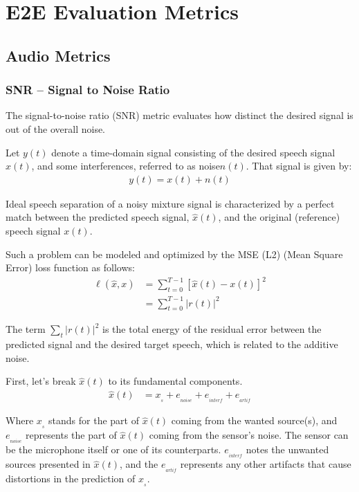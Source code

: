 \chapter{E2E Evaluation Metrics}\label{ch:metrics}
\section{Audio Metrics}
\subsection{SNR -- Signal to Noise Ratio}
The signal-to-noise ratio (SNR) metric evaluates how
distinct the desired signal is out of the overall noise.

Let \(y(t)\) denote a time-domain signal consisting of
the desired speech signal \(x(t)\), and some interferences,
referred to as noise\(n(t)\).
That signal is given by:
\begin{align}
    y(t) = x(t) + n(t)
\end{align}


Ideal speech separation of a noisy mixture signal is characterized by
a perfect match between the predicted speech signal, \(\widehat{x}(t)\), 
and the original (reference) speech signal \(x(t)\).

Such a problem can be modeled and optimized 
by the MSE (L2) (Mean Square Error) loss function as follows:
\begin{align}
    \ell(\widehat{x}, x) & = \sum_{t=0}^{T-1} \left[\widehat{x}(t) - x(t)\right]^{2} \\
    & = \sum_{t=0}^{T-1} |r(t)|^{2}
\end{align}

The term \(\sum_{t} |r(t)|^{2}\) 
is the total energy of the residual error between 
the predicted signal and the desired target speech,
which is related to the additive noise.

First, let's break \(\widehat{x}(t)\) to its fundamental components\cite{1643671}.
\begin{align}
    \widehat{x}(t) & = x_{_{s}} + e_{_{noise}} + e_{_{interf}} + e_{_{artif}}
\end{align}

Where \(x_{_{s}}\) stands for the
part of \(\widehat{x}(t)\) coming from the 
wanted source(s), and \(e_{_{noise}}\) represents the part 
of \(\widehat{x}(t)\) coming from the sensor's noise. The sensor
can be the microphone itself or one of its counterparts.
\(e_{_{interf}}\) notes the unwanted sources presented
in \(\widehat{x}(t)\), and the \(e_{_{artif}}\)
represents any other artifacts that cause
distortions in the prediction of \(x_{_{s}}\).

